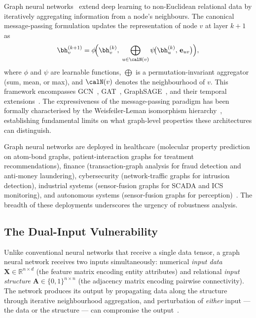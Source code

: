 Graph neural networks~\cite{Kipf2017,Velickovic2018,Hamilton2017} extend deep learning to non-Euclidean relational data by iteratively aggregating information from a node's neighbours. The canonical message-passing formulation updates the representation of node $v$ at layer $k+1$ as
\begin{equation}
\bh_v^{(k+1)}
= \phi\!\Bigl(\bh_v^{(k)},\;
  \bigoplus_{u\in\calN(v)}
    \psi\!\bigl(\bh_u^{(k)},\, \mathbf{e}_{uv}\bigr)\Bigr),
\label{eq:ch1_mp}
\end{equation}
where $\phi$ and $\psi$ are learnable functions, $\bigoplus$ is a permutation-invariant aggregator (sum, mean, or max), and $\calN(v)$ denotes the neighbourhood of $v$. This framework encompasses GCN~\cite{Kipf2017}, GAT~\cite{Velickovic2018}, GraphSAGE~\cite{Hamilton2017}, and their temporal extensions~\cite{Xu2020tgat,Rossi2020,Pei2020tgn,Kazemi2020,Schlichtkrull2018}. The expressiveness of the message-passing paradigm has been formally characterised by the Weisfeiler-Leman isomorphism hierarchy~\cite{Xu2019gin}, establishing fundamental limits on what graph-level properties these architectures can distinguish.

Graph neural networks are deployed in healthcare (molecular property prediction on atom-bond graphs, patient-interaction graphs for treatment recommendations), finance (transaction-graph analysis for fraud detection and anti-money laundering), cybersecurity (network-traffic graphs for intrusion detection), industrial systems (sensor-fusion graphs for SCADA and ICS monitoring), and autonomous systems (sensor-fusion graphs for perception)~\cite{Goodfellow2014gan,Gilmer2017,Gilmer2018,Ying2021,Wu2021,Luo2021}. The breadth of these deployments underscores the urgency of robustness analysis.


\subsection{The Dual-Input Vulnerability}

Unlike conventional neural networks that receive a single data tensor, a graph neural network receives two inputs simultaneously: numerical \emph{input data} $\mathbf{X}\in\mathbb{R}^{n\times d}$ (the feature matrix encoding entity attributes) and relational \emph{input structure} $\mathbf{A}\in\{0,1\}^{n\times n}$ (the adjacency matrix encoding pairwise connectivity). The network produces its output by propagating data along the structure through iterative neighbourhood aggregation, and perturbation of \emph{either} input --- the data or the structure --- can compromise the output~\cite{Zuegner2018,Bojchevski2019,Dai2018}.

